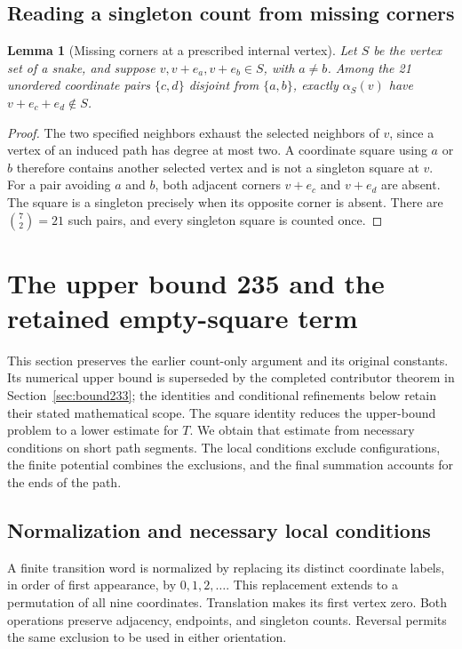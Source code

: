\documentclass[11pt,a4paper]{article}
\newtheorem{lemma}[theorem]{Lemma}
\theoremstyle{definition}
\theoremstyle{remark}
\begin{document}
\subsection{Reading a singleton count from missing corners}
\begin{lemma}[Missing corners at a prescribed internal vertex]\label{lem:window-missing-corners}
Let $S$ be the vertex set of a snake, and suppose $v,v+e_a,v+e_b\in S$, with $a\ne b$. Among the 21 unordered coordinate pairs $\{c,d\}$ disjoint from $\{a,b\}$, exactly $\alpha_S(v)$ have $v+e_c+e_d\notin S$.
\end{lemma}
\begin{proof}
The two specified neighbors exhaust the selected neighbors of $v$, since a vertex of an induced path has degree at most two. A coordinate square using $a$ or $b$ therefore contains another selected vertex and is not a singleton square at $v$. For a pair avoiding $a$ and $b$, both adjacent corners $v+e_c$ and $v+e_d$ are absent. The square is a singleton precisely when its opposite corner is absent. There are $\binom{7}{2}=21$ such pairs, and every singleton square is counted once.
\end{proof}

\section{The upper bound 235 and the retained empty-square term}\label{sec:upper-proof}
This section preserves the earlier count-only argument and its original
constants. Its numerical upper bound is superseded by the completed
contributor theorem in Section~\ref{sec:bound233}; the identities and
conditional refinements below retain their stated mathematical scope.
The square identity reduces the upper-bound problem to a lower estimate for $T$. We obtain that estimate from necessary conditions on short path segments. The local conditions exclude configurations, the finite potential combines the exclusions, and the final summation accounts for the ends of the path.
\subsection{Normalization and necessary local conditions}
A finite transition word is normalized by replacing its distinct coordinate labels, in order of first appearance, by $0,1,2,\ldots$. This replacement extends to a permutation of all nine coordinates. Translation makes its first vertex zero. Both operations preserve adjacency, endpoints, and singleton counts. Reversal permits the same exclusion to be used in either orientation.
\end{document}
